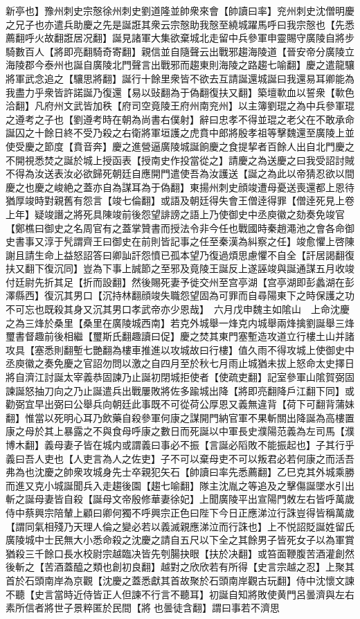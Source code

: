 新亭也】豫州刺史宗慤徐州刺史劉道隆並帥衆來會【帥讀曰率】兖州刺史沈僧明慶之兄子也亦遣兵助慶之先是誕誑其衆云宗慤助我慤至繞城躍馬呼曰我宗慤也【先悉薦翻呼火故翻誑居况翻】誕見諸軍大集欲棄城北走留中兵參軍申靈賜守廣陵自將步騎數百人【將即亮翻騎奇寄翻】親信並自隨聲云出戰邪趨海陵道【晉安帝分廣陵立海陵郡今泰州也誕自廣陵北門聲言出戰邪而趨東則海陵之路趨七喻翻】慶之遣龍驤將軍武念追之【驤思將翻】誕行十餘里衆皆不欲去互請誕還城誕曰我還易耳卿能為我盡力乎衆皆許諾誕乃復還【易以䜴翻為于偽翻復扶又翻】築壇㰱血以誓衆【㰱色洽翻】凡府州文武皆加秩【府司空竟陵王府州南兖州】以主簿劉琨之為中兵參軍琨之遵考之子也【劉遵考時在朝為尚書右僕射】辭曰忠孝不得並琨之老父在不敢承命誕囚之十餘日終不受乃殺之右衛將軍垣護之虎賁中郎將殷孝祖等擊魏還至廣陵上並使受慶之節度【賁音奔】慶之進營逼廣陵城誕餉慶之食提挈者百餘人出自北門慶之不開視悉焚之誕於城上授函表【授南史作投當從之】請慶之為送慶之曰我受詔討賊不得為汝送表汝必欲歸死朝廷自應開門遣使吾為汝護送【誕之為此以帝猜忍欲以間慶之也慶之峻絶之蓋亦自為謀耳為于偽翻】東揚州刺史顔竣遭母憂送喪還都上恩待猶厚竣時對親舊有怨言【竣七倫翻】或語及朝廷得失會王僧逹得罪【僧逹死見上卷上年】疑竣譖之將死具陳竣前後怨望誹謗之語上乃使御史中丞庾徽之劾奏免竣官【鄭樵曰御史之名周官有之蓋掌贊書而授法令非今任也戰國時秦趙澠池之會各命御史書事又淳于髠謂齊王曰御史在前則皆記事之任至秦漢為糾察之任】竣愈懼上啓陳謝且請生命上益怒詔答曰卿訕訐怨憤已孤本望乃復過煩思慮懼不自全【訐居謁翻復扶又翻下復沉同】豈為下事上誠節之至邪及竟陵王誕反上遂誣竣與誕通謀五月收竣付廷尉先折其足【折而設翻】然後賜死妻予徙交州至宫亭湖【宫亭湖即彭蠡湖在彭澤縣西】復沉其男口【沉持林翻顔竣失職怨望固為可罪而自尋陽東下之時保護之功不可忘也既殺其身又沉其男口孝武帝亦少恩哉】　六月戊申魏主如隂山　上命沈慶之為三烽於桑里【桑里在廣陵城西南】若克外城舉一烽克内城舉兩烽擒劉誕舉三烽璽書督趣前後相繼【璽斯氏翻趣讀曰促】慶之焚其東門塞塹造攻道立行樓土山并諸攻具【塞悉則翻塹七艷翻為樓車推進以攻城故曰行樓】值久雨不得攻城上使御史中丞庾徽之奏免慶之官詔勿問以激之自四月至於秋七月雨止城猶未拔上怒命太史擇日將自濟江討誕太宰義恭固諫乃止誕初閉城拒使者【使疏吏翻】記室參軍山隂賀弼固諫誕怒抽刀向之乃止誕遣兵出戰屢敗將佐多踰城出降【將即亮翻降戶江翻下同】或勸弼宜早出弼曰公舉兵向朝廷此事既不可從荷公厚恩又義無違背【荷下可翻背蒲妹翻】惟當以死明心耳乃飲藥自殺參軍何康之謀開門納官軍不果斬關出降誕為高樓置康之母於其上暴露之不與食母呼康之數日而死誕以中軍長史濮陽范義為左司馬【濮博木翻】義母妻子皆在城内或謂義曰事必不振【言誕必䧟敗不能振起也】子其行乎義曰吾人吏也【人吏言為人之佐吏】子不可以棄母吏不可以叛君必若何康之而活吾弗為也沈慶之帥衆攻城身先士卒親犯矢石【帥讀曰率先悉薦翻】乙巳克其外城乘勝而進又克小城誕聞兵入走趨後園【趨七喻翻】隊主沈胤之等追及之擊傷誕墜水引出斬之誕母妻皆自殺【誕母文帝殷修華妻徐妃】上聞廣陵平出宣陽門敇左右皆呼萬歲侍中蔡興宗陪輦上顧曰卿何獨不呼興宗正色曰陛下今日正應涕泣行誅豈得皆稱萬歲【謂同氣相殘乃天理人倫之變必若以義滅親應涕泣而行誅也】上不悦詔貶誕姓留氏廣陵城中士民無大小悉命殺之沈慶之請自五尺以下全之其餘男子皆死女子以為軍賞猶殺三千餘口長水校尉宗越臨决皆先刳腸抉眼【扶於决翻】或笞面鞭腹苦酒灌創然後斬之【苦酒蓋醯之類也創初良翻】越對之欣欣若有所得【史言宗越之忍】上聚其首於石頭南岸為京觀【沈慶之蓋悉獻其首故聚於石頭南岸觀古玩翻】侍中沈懷文諫不聽【史言當時近侍皆正人但諫不行言不聽耳】初誕自知將敗使黄門呂曇濟與左右素所信者將世子景粹匿於民間【將也曇徒含翻】謂曰事若不濟思
